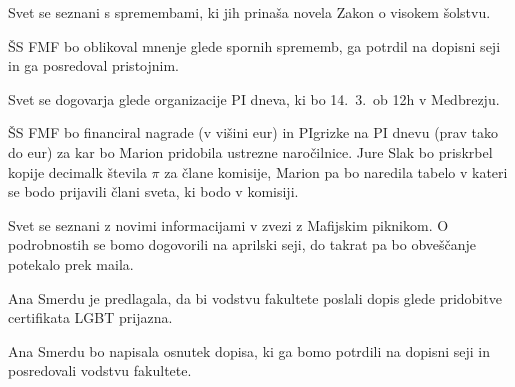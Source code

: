 \documentclass{seja}
\begin{document}
\begin{ad}
\item Svet se seznani s spremembami, ki jih prinaša novela Zakon o visokem šolstvu.

\begin{sklep*}
ŠS FMF bo oblikoval mnenje glede spornih sprememb, ga potrdil na dopisni seji in ga
posredoval pristojnim.
\end{sklep*}

\item  Svet se dogovarja glede organizacije PI dneva, ki bo 14.~3.~ob 12h v Medbrezju.

\begin{sklep*}
ŠS FMF bo financiral nagrade (v višini \unit[100]{eur}) in PIgrizke na PI dnevu
(prav tako do \unit[100]{eur})
za kar bo Marion pridobila ustrezne naročilnice. Jure Slak bo priskrbel kopije
decimalk števila $\pi$ za člane komisije, Marion pa bo naredila tabelo v kateri
se bodo prijavili člani sveta, ki bodo v komisiji.
\end{sklep*}

\item Svet se seznani z novimi informacijami v zvezi z Mafijskim piknikom.
O podrobnostih se bomo dogovorili na aprilski seji, do takrat pa bo
obveščanje potekalo prek maila.

\item Ana Smerdu je predlagala, da bi vodstvu fakultete poslali dopis glede
pridobitve certifikata LGBT prijazna.

\begin{sklep*}
Ana Smerdu bo napisala osnutek dopisa, ki ga bomo potrdili na dopisni seji in posredovali
vodstvu fakultete.
\end{sklep*}

\end{ad}

\makeatletter \global\let\@enddocumenthook\@empty \makeatother
{}
\end{document}
